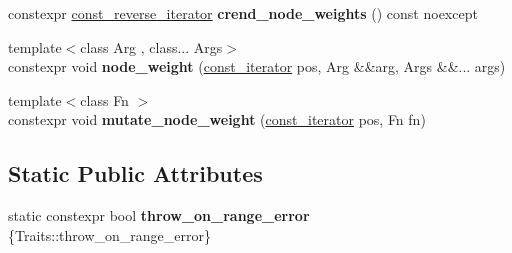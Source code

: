\begin{DoxyCompactItemize}
constexpr \mbox{\hyperlink{classsequoia_1_1utilities_1_1iterator}{const\+\_\+reverse\+\_\+iterator}} {\bfseries crend\+\_\+node\+\_\+weights} () const noexcept
\item 
\mbox{\label{classsequoia_1_1maths_1_1graph__impl_1_1node__storage_a310e468a34b036ccc519b1f54715b10f}} 
{\footnotesize template$<$class Arg , class... Args$>$ }\\constexpr void {\bfseries node\+\_\+weight} (\mbox{\hyperlink{classsequoia_1_1utilities_1_1iterator}{const\+\_\+iterator}} pos, Arg \&\&arg, Args \&\&... args)
\item 
\mbox{\label{classsequoia_1_1maths_1_1graph__impl_1_1node__storage_ad5747162006b09ab2b0c4cd204e8a961}} 
{\footnotesize template$<$class Fn $>$ }\\constexpr void {\bfseries mutate\+\_\+node\+\_\+weight} (\mbox{\hyperlink{classsequoia_1_1utilities_1_1iterator}{const\+\_\+iterator}} pos, Fn fn)
\end{DoxyCompactItemize}
\subsection*{Static Public Attributes}
\begin{DoxyCompactItemize}
\item 
\mbox{\label{classsequoia_1_1maths_1_1graph__impl_1_1node__storage_a2a48b40151f60b36a727668769612eb4}} 
static constexpr bool {\bfseries throw\+\_\+on\+\_\+range\+\_\+error} \{Traits\+::throw\+\_\+on\+\_\+range\+\_\+error\}
\end{DoxyCompactItemize}
